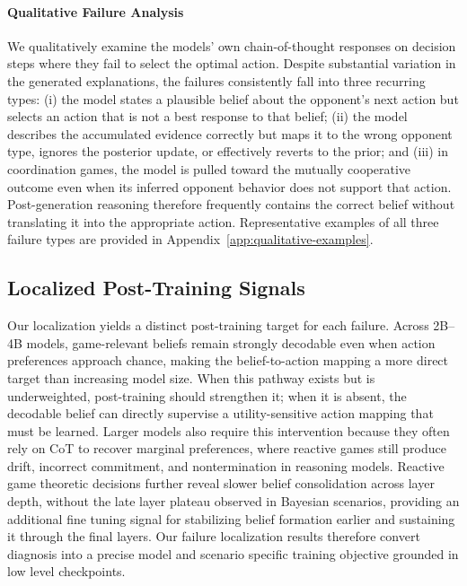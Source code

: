 \documentclass[letterpaper]{article} %
\begin{document}
\paragraph{Qualitative Failure Analysis}
\label{sec:qualitative-analysis}

We qualitatively examine the models' own chain-of-thought responses on decision steps where they fail to select the optimal action. Despite substantial variation in the generated explanations, the failures consistently fall into three recurring types: (i) the model states a plausible belief about the opponent's next action but selects an action that is not a best response to that belief; (ii) the model describes the accumulated evidence correctly but maps it to the wrong opponent type, ignores the posterior update, or effectively reverts to the prior; and (iii) in coordination games, the model is pulled toward the mutually cooperative outcome even when its inferred opponent behavior does not support that action. Post-generation reasoning therefore frequently contains the correct belief without translating it into the appropriate action. Representative examples of all three failure types are provided in Appendix~\ref{app:qualitative-examples}.






\subsection{Localized Post-Training Signals}
\label{sec:post-training-signals}

Our localization yields a distinct post-training target for each failure. Across 2B--4B models, game-relevant beliefs remain strongly decodable even when action preferences approach chance, making the belief-to-action mapping a more direct target than increasing model size. When this pathway exists but is underweighted, post-training should strengthen it; when it is absent, the decodable belief can directly supervise a utility-sensitive action mapping that must be learned. Larger models also require this intervention because they often rely on CoT to recover marginal preferences, where reactive games still produce drift, incorrect commitment, and nontermination in reasoning models. Reactive game theoretic decisions further reveal slower belief consolidation across layer depth, without the late layer plateau observed in Bayesian scenarios, providing an additional fine tuning signal for stabilizing belief formation earlier and sustaining it through the final layers. Our failure localization results therefore convert diagnosis into a precise model and scenario specific training objective grounded in low level checkpoints.
\end{document}
